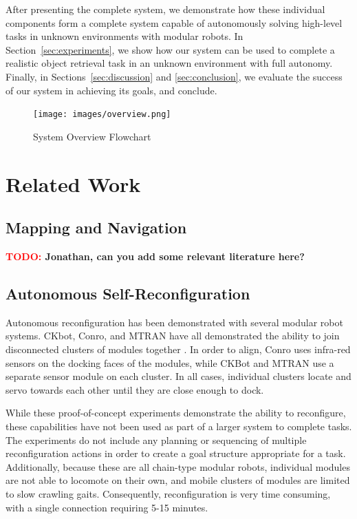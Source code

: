 \documentclass[conference]{IEEEtran}
\newcommand{\TODO}[1]{ {\bf \textcolor{red}{TODO:} #1 }}
\begin{document}
After presenting the complete system, we demonstrate how these individual components form a complete system capable of autonomously solving high-level tasks in unknown environments with modular robots.  In Section~\ref{sec:experiments}, we show how our system can be used to complete a realistic object retrieval task in an unknown environment with full autonomy.  Finally, in Sections~\ref{sec:discussion} and \ref{sec:conclusion}, we evaluate the success of our system in achieving its goals, and conclude.
%
\begin{figure}
\begin{center}
\texttt{[image: images/overview.png]}
\caption{System Overview Flowchart}
\label{fig:overview}
\end{center}
\end{figure} 
%

\section{Related Work}\label{sec:related-work}
%
\subsection{Mapping and Navigation}\label{mapping-and-navigation}
%
\TODO{Jonathan, can you add some relevant literature here?}
%
\subsection{Autonomous Self-Reconfiguration}
\label{autonomous-self-reconfiguration}
%
Autonomous reconfiguration has been demonstrated with several modular robot systems. CKbot, Conro, and MTRAN have all demonstrated the ability to join disconnected clusters of modules together \cite{Yim2007, Rubenstein2004,Murata2006}. In order to align, Conro uses infra-red sensors on the docking faces of the modules, while CKBot and MTRAN use a separate sensor module on each cluster.  In all cases, individual clusters locate and servo towards each other until they are close enough to dock.

While these proof-of-concept experiments demonstrate the ability to reconfigure, these capabilities have not been used as part of a larger system to complete tasks. The experiments do not include any planning or sequencing of multiple reconfiguration actions in order to create a goal structure appropriate for a task.  Additionally, because these are all chain-type modular robots, individual modules are not able to locomote on their own, and mobile clusters of modules are limited to slow crawling gaits.  Consequently, reconfiguration is very time consuming, with a single connection requiring 5-15 minutes.
\end{document}
